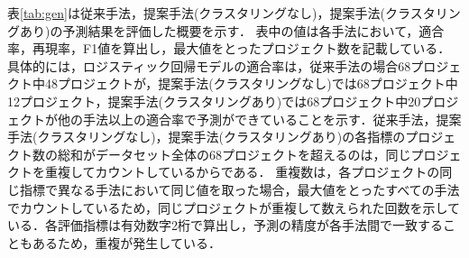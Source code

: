 \documentclass[submit,noauthor,dvipdfmx]{ipsj}
\begin{document}
\begin{table}{}
    \centering
    \caption{ロジスティック回帰モデルで再現率とF1値が顕著に変化した予測結果}
    \label{tab:log-super}
    \vspace{3mm}
\end{table}


表\ref{tab:gen}は従来手法，提案手法(クラスタリングなし)，提案手法(クラスタリングあり)の予測結果を評価した概要を示す．
表中の値は各手法において，適合率，再現率，F1値を算出し，最大値をとったプロジェクト数を記載している．
具体的には，ロジスティック回帰モデルの適合率は，従来手法の場合68プロジェクト中48プロジェクトが，提案手法(クラスタリングなし)では68プロジェクト中12プロジェクト，提案手法(クラスタリングあり)では68プロジェクト中20プロジェクトが他の手法以上の適合率で予測ができていることを示す．従来手法，提案手法(クラスタリングなし)，提案手法(クラスタリングあり)の各指標のプロジェクト数の総和がデータセット全体の68プロジェクトを超えるのは，同じプロジェクトを重複してカウントしているからである．
重複数は，各プロジェクトの同じ指標で異なる手法において同じ値を取った場合，最大値をとったすべての手法でカウントしているため，同じプロジェクトが重複して数えられた回数を示している．各評価指標は有効数字2桁で算出し，予測の精度が各手法間で一致することもあるため，重複が発生している．
\end{document}
